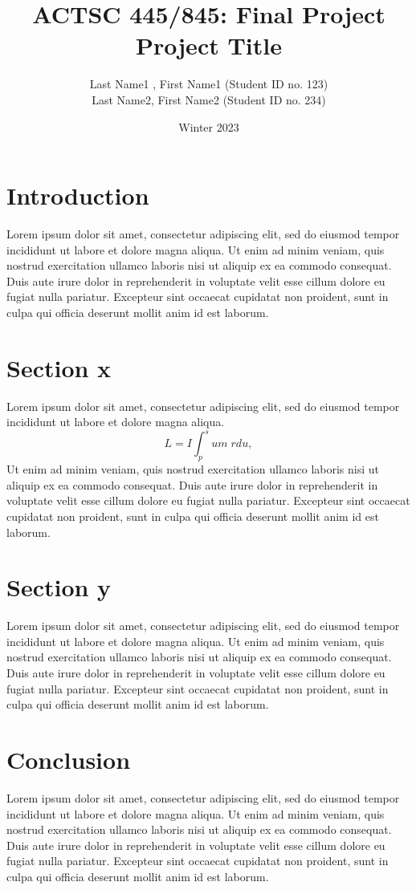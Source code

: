 \documentclass{article}
\begin{document}
\lstset{language=R}
\title{
      ACTSC 445/845: Final Project  \\  %
      Project Title     %
        }
\author{Last Name1 , First Name1 (Student ID no. 123) \\
Last Name2, First Name2 (Student ID no. 234)
}  
\date{Winter 2023} 
\maketitle

\section{Introduction}
Lorem ipsum dolor sit amet, consectetur adipiscing elit, sed do eiusmod tempor incididunt ut labore et dolore magna aliqua. Ut enim ad minim veniam, quis nostrud exercitation ullamco laboris nisi ut aliquip ex ea commodo consequat. Duis aute irure dolor in reprehenderit in voluptate velit esse cillum dolore eu fugiat nulla pariatur. Excepteur sint occaecat cupidatat non proident, sunt in culpa qui officia deserunt mollit anim id est laborum.

\section{Section x}
Lorem ipsum dolor sit amet, consectetur adipiscing elit, sed do eiusmod tempor incididunt ut labore et dolore magna aliqua. 
$$ L=I \int_{p}^s um \;rd u,$$
Ut enim ad minim veniam, quis nostrud exercitation ullamco laboris nisi ut aliquip ex ea commodo consequat. Duis aute irure dolor in reprehenderit in voluptate velit esse cillum dolore eu fugiat nulla pariatur. Excepteur sint occaecat cupidatat non proident, sunt in culpa qui officia deserunt mollit anim id est laborum.

\section{Section y}
Lorem ipsum dolor sit amet, consectetur adipiscing elit, sed do eiusmod tempor incididunt ut labore et dolore magna aliqua. 
Ut enim ad minim veniam, quis nostrud exercitation ullamco laboris nisi ut aliquip ex ea commodo consequat. Duis aute irure dolor in reprehenderit in voluptate velit esse cillum dolore eu fugiat nulla pariatur. Excepteur sint occaecat cupidatat non proident, sunt in culpa qui officia deserunt mollit anim id est laborum.

\section{Conclusion}
Lorem ipsum dolor sit amet, consectetur adipiscing elit, sed do eiusmod tempor incididunt ut labore et dolore magna aliqua. 
Ut enim ad minim veniam, quis nostrud exercitation ullamco laboris nisi ut aliquip ex ea commodo consequat. Duis aute irure dolor in reprehenderit in voluptate velit esse cillum dolore eu fugiat nulla pariatur. Excepteur sint occaecat cupidatat non proident, sunt in culpa qui officia deserunt mollit anim id est laborum.

\end{document}
